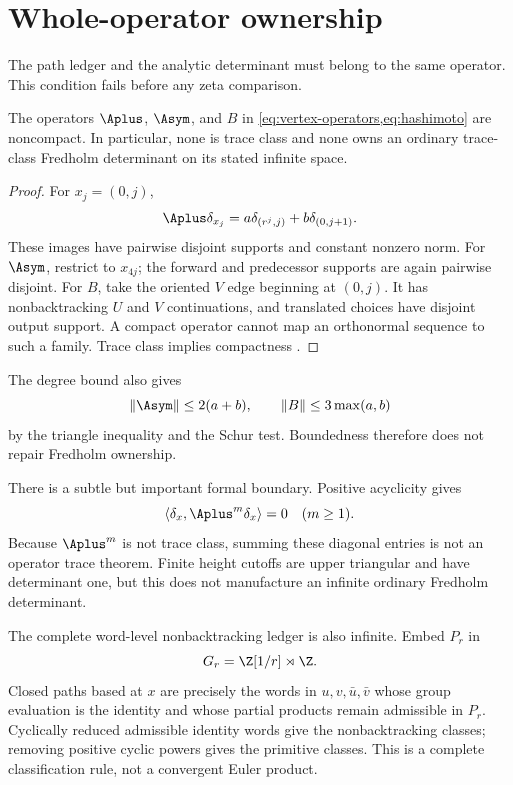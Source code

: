 \section{Whole-operator ownership}
\label{sec:ownership}

The path ledger and the analytic determinant must belong to the same
operator.  This condition fails before any zeta comparison.

\begin{proposition}
\label{prop:noncompactness}
The operators $\Aplus$, $\Asym$, and $B$ in
\cref{eq:vertex-operators,eq:hashimoto} are noncompact.  In particular, none
is trace class and none owns an ordinary trace-class Fredholm determinant on
its stated infinite space.
\end{proposition}

\begin{proof}
For $x_j=(0,j)$,
\[
\Aplus\delta_{x_j}
=a\delta_{(r^j,j)}+b\delta_{(0,j+1)}.
\]
These images have pairwise disjoint supports and constant nonzero norm.
For $\Asym$, restrict to $x_{4j}$; the forward and predecessor supports are
again pairwise disjoint.  For $B$, take the oriented $V$ edge beginning at
$(0,j)$.  It has nonbacktracking $U$ and $V$ continuations, and translated
choices have disjoint output support.  A compact operator cannot map an
orthonormal sequence to such a family.  Trace class implies compactness
\citep{Simon2005}.
\end{proof}

The degree bound also gives
\[
\|\Asym\|\le2(a+b),\qquad
\|B\|\le3\max(a,b)
\]
by the triangle inequality and the Schur test.  Boundedness therefore does
not repair Fredholm ownership.

There is a subtle but important formal boundary.  Positive acyclicity gives
\[
\langle\delta_x,\Aplus^m\delta_x\rangle=0
\quad(m\ge1).
\]
Because $\Aplus^m$ is not trace class, summing these diagonal entries is not
an operator trace theorem.  Finite height cutoffs are upper triangular and
have determinant one, but this does not manufacture an infinite ordinary
Fredholm determinant.

The complete word-level nonbacktracking ledger is also infinite.  Embed
$P_r$ in
\[
G_r=\Z[1/r]\rtimes\Z.
\]
Closed paths based at $x$ are precisely the words in
$u,v,\bar u,\bar v$ whose group evaluation is the identity and whose partial
products remain admissible in $P_r$.  Cyclically reduced admissible identity
words give the nonbacktracking classes; removing positive cyclic powers gives
the primitive classes.  This is a complete classification rule, not a
convergent Euler product.
